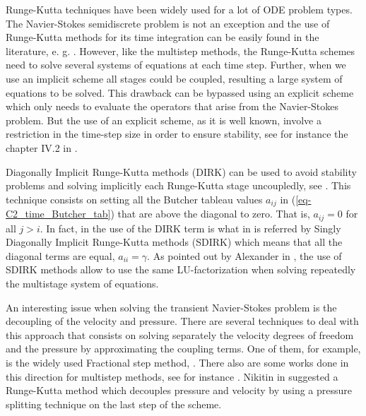 Runge-Kutta techniques have been widely used for a lot of ODE problem types. The Navier-Stokes semidiscrete problem is not an exception and the use of Runge-Kutta methods for its time integration can be easily found in the literature, e. g. \cite{nikitin_third-order-accurate_2006,sanderse_energy-conserving_2013,sanderse_accuracy_2012,sterner_semi-implicit_1997}. However, like the multistep methods, the Runge-Kutta schemes need to solve several systems of equations at each time step. Further, when we use an implicit scheme all stages could be coupled, resulting a large system of equations to be solved. This drawback can be bypassed using an explicit scheme which only needs to evaluate the operators that arise from the Navier-Stokes problem. But the use of an explicit scheme, as it is well known, involve a restriction in the time-step size in order to ensure stability, see for instance the chapter IV.2 in \cite{hairer_solving_1993}. 

Diagonally Implicit Runge-Kutta methods (DIRK) can be used to avoid stability problems and solving implicitly each Runge-Kutta stage uncoupledly, see \cite{alexander_diagonally_1977}. This technique consists on setting all the Butcher tableau values $a_{ij}$ in (\ref{eq-C2_time_Butcher_tab}) that are above the diagonal to zero. That is, $a_{ij} = 0$ for all $j>i$. In fact, in \cite{alexander_diagonally_1977} the use of the DIRK term is what in \cite{hairer_solving_1993} is referred by Singly Diagonally Implicit Runge-Kutta methods (SDIRK) which means that all the diagonal terms are equal, $a_{ii}=\gamma$. As pointed out by Alexander in \cite{alexander_diagonally_1977}, the use of SDIRK methods allow to use the same LU-factorization when solving repeatedly the multistage system of equations.

An interesting issue when solving the transient Navier-Stokes problem is the decoupling of the velocity and pressure. There are several techniques to deal with this approach that consists on solving separately the velocity degrees of freedom and the pressure by approximating the coupling terms. One of them, for example, is the widely used Fractional step method, \cite{donea_finite_1982}. There also are some works done in this direction for multistep methods, see for instance \cite{kim_application_1985}. Nikitin in \cite{nikitin_third-order-accurate_2006} suggested a Runge-Kutta method which decouples pressure and velocity by using a pressure splitting technique on the last step of the scheme.

